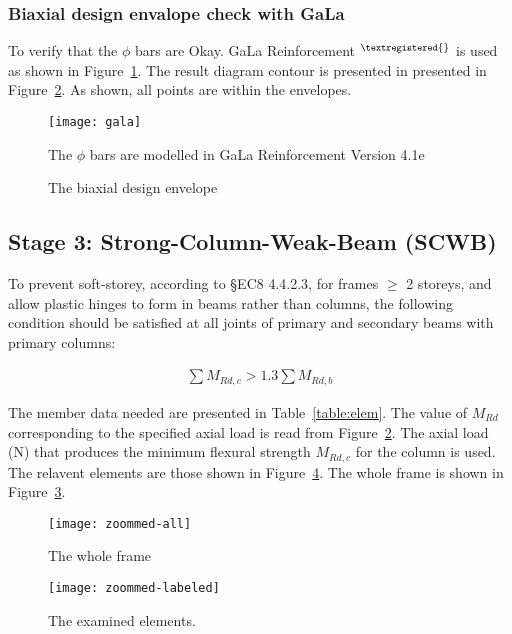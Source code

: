 \newcommand{\TenBar}{\g{barn} $\phi$ \g{bard} bars}
\subsubsection{Biaxial design envalope check with GaLa}
To verify that the \TenBar{} are Okay. GaLa Reinforcement
$^{\textregistered{}}$ is used as shown in Figure~\ref{fig:gala}. The result
diagram contour is presented in presented in Figure~\ref{fig:envlop}. As shown,
all points are within the envelopes.

\begin{figure}
  \centering
  \texttt{[image: gala]}
  \caption{The \TenBar{} are modelled in GaLa Reinforcement Version 4.1e}\label{fig:gala}
\end{figure}

\begin{figure}
  \centering
  
  \caption{The biaxial design envelope}\label{fig:envlop}
\end{figure}


\clearpage
\subsection{Stage 3: Strong-Column-Weak-Beam (SCWB)}
To prevent soft-storey, according to \S EC8 4.4.2.3, for frames $\ge$ 2 storeys,
and allow plastic hinges to form in beams rather than columns, the following
condition should be satisfied at all joints of primary and secondary beams with
primary columns:

\begin{align*}
\sum M_{Rd,c} > 1.3 \sum M_{Rd,b}
\end{align*}

The member data needed are presented in Table~\ref{table:elem}. The value of
$M_{Rd}$ corresponding to the specified axial load is read from
Figure~\ref{fig:envlop}. The axial load (N) that produces the minimum flexural
strength $M_{Rd,c}$ for the column is used. The relavent elements are those
shown in Figure~\ref{fig:zl}. The whole frame is shown in Figure~\ref{fig:za}.

\begin{figure}
  \centering
  \texttt{[image: zoommed-all]}
  \caption{The whole frame}\label{fig:za}
\end{figure}

\begin{figure}
  \centering
  \texttt{[image: zoommed-labeled]}
  \caption{The examined elements.}\label{fig:zl}
\end{figure}


